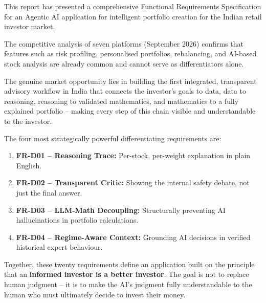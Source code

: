 \documentclass[12pt, a4paper, openany, oneside]{report}
\begin{document}
This report has presented a comprehensive Functional Requirements Specification for an Agentic AI application for intelligent portfolio creation for the Indian retail investor market.

The competitive analysis of seven platforms (September 2026) confirms that features such as risk profiling, personalised portfolios, rebalancing, and AI-based stock analysis are already common and cannot serve as differentiators alone.

The genuine market opportunity lies in building the first integrated, transparent advisory workflow in India that connects the investor's goals to data, data to reasoning, reasoning to validated mathematics, and mathematics to a fully explained portfolio -- making every step of this chain visible and understandable to the investor.

The four most strategically powerful differentiating requirements are:

\begin{enumerate}
  \item \textbf{FR-D01 -- Reasoning Trace:} Per-stock, per-weight explanation in plain English.
  \item \textbf{FR-D02 -- Transparent Critic:} Showing the internal safety debate, not just the final answer.
  \item \textbf{FR-D03 -- LLM-Math Decoupling:} Structurally preventing AI hallucinations in portfolio calculations.
  \item \textbf{FR-D04 -- Regime-Aware Context:} Grounding AI decisions in verified historical expert behaviour.
\end{enumerate}

Together, these twenty requirements define an application built on the principle that an \textbf{informed investor is a better investor}. The goal is not to replace human judgment -- it is to make the AI's judgment fully understandable to the human who must ultimately decide to invest their money.
\end{document}
